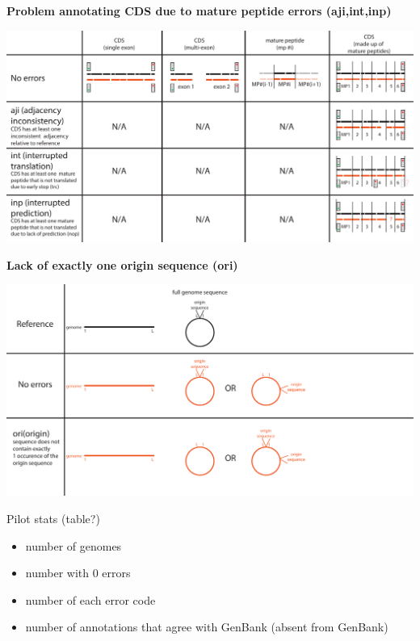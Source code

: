 \documentclass[landscape]{slides}
\begin{document}
\begin{slide}
\begin{center}
\textbf{Problem annotating CDS due to mature peptide errors (aji,int,inp)}
\vspace{0.5in}

\includegraphics[width=10in]{figs/error-8-aji-int-inp}
\end{center}
\vfill
\end{slide}
\begin{slide}
\begin{center}
\textbf{Lack of exactly one origin sequence (ori)}
\vspace{0.5in}

\includegraphics[width=10in]{figs/error-9-ori}
\end{center}
\vfill
\end{slide}
\begin{slide}

Pilot stats (table?)
\begin{itemize}
\item number of genomes
\item number with 0 errors
\item number of each error code
\item number of annotations that agree with GenBank (absent from GenBank)
\end{itemize}

\vfill
\end{slide}
\end{document}
